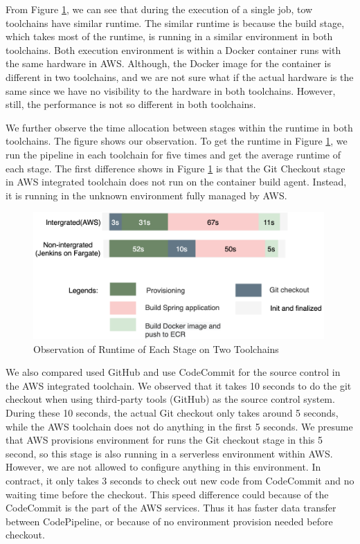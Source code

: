   \par
From Figure \ref{fig:stage_runtime}, we can see that during the execution of a single job, tow toolchains have similar runtime. The similar runtime is because the build stage, which takes most of the runtime, is running in a similar environment in both toolchains. Both execution environment is within a Docker container runs with the same hardware in AWS. Although, the Docker image for the container is different in two toolchains, and we are not sure what if the actual hardware is the same since we have no visibility to the hardware in both toolchains. However, still, the performance is not so different in both toolchains.
\par
We further observe the time allocation between stages within the runtime in both toolchains. The figure shows our observation. To get the runtime in Figure \ref{fig:stage_runtime}, we run the pipeline in each toolchain for five times and get the average runtime of each stage. The first difference shows in Figure \ref{fig:stage_runtime} is that the Git Checkout stage in AWS integrated toolchain does not run on the container build agent. Instead, it is running in the unknown environment fully managed by AWS.
\begin{figure}[!h]
  \centering
  \includegraphics[width=0.99\textwidth]{pics/stages.png}
  \caption{Observation of Runtime of Each Stage on Two Toolchains}
  \label{fig:stage_runtime}
  \end{figure}
\par
We also compared used GitHub and use CodeCommit for the source control in the AWS integrated toolchain. 
We observed that it takes 10 seconds to do the git checkout when using third-party tools (GitHub) as the source control system. During these 10 seconds, the actual Git checkout only takes around 5 seconds, while the AWS toolchain does not do anything in the first 5 seconds. We presume that AWS provisions environment for runs the Git checkout stage in this 5 second, so this stage is also running in a serverless environment within AWS. However, we are not allowed to configure anything in this environment. In contract, it only takes 3 seconds to check out new code from CodeCommit and no waiting time before the checkout. This speed difference could because of the CodeCommit is the part of the AWS services. Thus it has faster data transfer between CodePipeline, or because of no environment provision needed before checkout.
